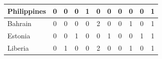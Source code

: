 \documentclass[12pt]{article}  %
\begin{document}
\begin{subappendices}
\begin{longtable}{|l|c|c|c|c|c|c|c|c|c|c|}
	\hline
	Philippines                                                    & 0                                                                      & 0                                                                      & 0                                                                      & 1                                                                      & 0                                                                      & 0                                                                      & 0                         & 0                           & 0                           & 1                           \\ 
	\hline
	Bahrain                                                        & 0                                                                      & 0                                                                      & 0                                                                      & 0                                                                      & 2                                                                      & 0                                                                      & 0                         & 1                           & 0                           & 1                           \\ 
	\hline
	Estonia                                                        & 0                                                                      & 0                                                                      & 1                                                                      & 0                                                                      & 0                                                                      & 1                                                                      & 0                         & 0                           & 1                           & 1                           \\ 
	\hline
	Liberia                                                        & 0                                                                      & 1                                                                      & 0                                                                      & 0                                                                      & 2                                                                      & 0                                                                      & 0                         & 1                           & 0                           & 1                           \\ 

\end{longtable}
\end{subappendices}
\end{document}
